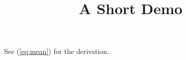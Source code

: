 \documentclass[article]{jss}
\title{A Short Demo}
\begin{document}
See (\ref{eq:mean}) for the derivation.
\end{document}
